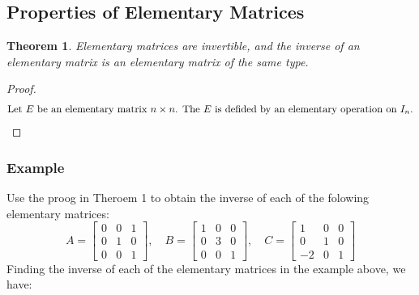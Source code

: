 \documentclass[10pt, oneside]{article}
\newtheorem{thm}{Theorem}
\begin{document}
\subsection{Properties of Elementary Matrices}
\begin{thm}
	Elementary matrices are invertible, and the inverse of an elementary matrix is an elementary matrix of the same type.
\end{thm}

\begin{proof}
	\begin{align*}
		\intertext{Let $E$ be an elementary matrix $n \times n$. The $E$ is defided by an elementary operation on $I_n$.}
	\end{align*}
\end{proof}

\subsubsection{Example}
Use the proog in Theroem 1 to obtain the inverse of each of the folowing elementary matrices:
\[
	A = \begin{bmatrix} 0 & 0 & 1 \\ 0 & 1 & 0 \\ 0 & 0 & 1 \end{bmatrix}, \quad
	B = \begin{bmatrix} 1 & 0 & 0 \\ 0 & 3 & 0 \\ 0 & 0 & 1 \end{bmatrix}, \quad
	C = \begin{bmatrix} 1 & 0 & 0 \\ 0 & 1 & 0 \\ -2 & 0 & 1 \end{bmatrix}
\]
Finding the inverse of each of the elementary matrices in the example above, we have:
\end{document}
